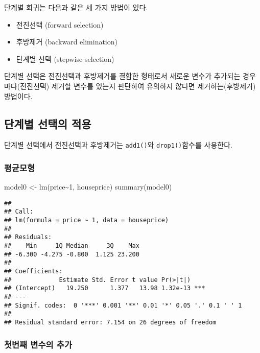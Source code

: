 \documentclass[
]{book}
\newenvironment{Shaded}{\begin{snugshade}}{\end{snugshade}}
\newcommand{\DecValTok}[1]{\textcolor[rgb]{0.00,0.00,0.81}{#1}}
\newcommand{\FunctionTok}[1]{\textcolor[rgb]{0.00,0.00,0.00}{#1}}
\newcommand{\NormalTok}[1]{#1}
\newcommand{\OtherTok}[1]{\textcolor[rgb]{0.56,0.35,0.01}{#1}}
\newcommand{\SpecialCharTok}[1]{\textcolor[rgb]{0.00,0.00,0.00}{#1}}
\providecommand{\tightlist}{%
  \setlength{\itemsep}{0pt}\setlength{\parskip}{0pt}}
\begin{document}
단계별 회귀는 다음과 같은 세 가지 방법이 있다.

\begin{itemize}
\tightlist
\item
  전진선택 (forward selection)
\item
  후방제거 (backward elimination)
\item
  단계별 선택 (stepwise selection)
\end{itemize}

단계별 선택은 전진선택과 후방제거를 결합한 형태로서 새로운 변수가 추가되는 경우마다(전진선택) 제거할 변수를 있는지 판단하여 유의하지 않다면 제거하는(후방제거) 방법이다.

\hypertarget{uxb2e8uxacc4uxbcc4-uxc120uxd0dduxc758-uxc801uxc6a9}{%
\subsection{단계별 선택의 적용}\label{uxb2e8uxacc4uxbcc4-uxc120uxd0dduxc758-uxc801uxc6a9}}

단계별 선택에서 전진선택과 후방제거는 \texttt{add1()}와 \texttt{drop1()}함수를 사용한다.

\hypertarget{uxd3c9uxade0uxbaa8uxd615}{%
\subsubsection{평균모형}\label{uxd3c9uxade0uxbaa8uxd615}}

\begin{Shaded}
\begin{Highlighting}[]
\NormalTok{model0 }\OtherTok{\textless{}{-}} \FunctionTok{lm}\NormalTok{(price}\SpecialCharTok{\textasciitilde{}}\DecValTok{1}\NormalTok{, houseprice)}
\FunctionTok{summary}\NormalTok{(model0)}
\end{Highlighting}
\end{Shaded}

\begin{verbatim}
## 
## Call:
## lm(formula = price ~ 1, data = houseprice)
## 
## Residuals:
##    Min     1Q Median     3Q    Max 
## -6.300 -4.275 -0.800  1.125 23.200 
## 
## Coefficients:
##             Estimate Std. Error t value Pr(>|t|)    
## (Intercept)   19.250      1.377   13.98 1.32e-13 ***
## ---
## Signif. codes:  0 '***' 0.001 '**' 0.01 '*' 0.05 '.' 0.1 ' ' 1
## 
## Residual standard error: 7.154 on 26 degrees of freedom
\end{verbatim}

\hypertarget{uxccabuxbc88uxc9f8-uxbcc0uxc218uxc758-uxcd94uxac00}{%
\subsubsection{첫번째 변수의 추가}\label{uxccabuxbc88uxc9f8-uxbcc0uxc218uxc758-uxcd94uxac00}}
\end{document}
